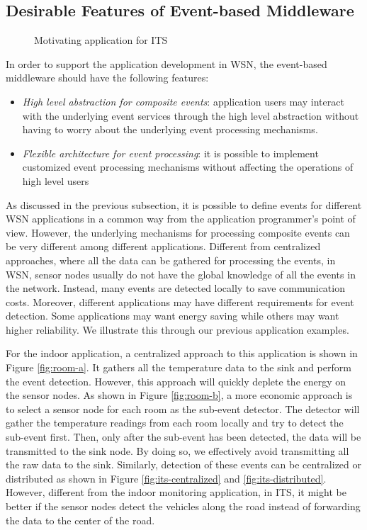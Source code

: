 \subsection{Desirable Features of Event-based Middleware}

\begin{figure}
\centering
{}
\caption{Motivating application for ITS}
\label{fig:its}
\end{figure}

In order to support the application development in WSN, the event-based middleware should have the following features:
\begin{itemize}
\item \emph{High level abstraction for composite events}: application users may interact with the underlying event services through the high level abstraction without having to worry about the underlying event processing mechanisms.
\item \emph{Flexible architecture for event processing}: it is possible to implement customized event processing mechanisms without affecting the operations of high level users
\end{itemize}

As discussed in the previous subsection, it is possible to define events for different WSN applications in a common way from the application programmer's point of view. However, the underlying mechanisms for processing composite events can be very different among different applications. Different from centralized approaches, where all the data can be gathered for processing the events, in WSN, sensor nodes usually do not have the global knowledge of all the events in the network. Instead, many events are detected locally to save communication costs. Moreover, different applications may have different requirements for event detection. Some applications may want energy saving while others may want higher reliability. We illustrate this through our previous application examples.

For the indoor application, a centralized approach to this application is shown in Figure \ref{fig:room-a}. It gathers all the temperature data to the sink and perform the event detection. However, this approach will quickly deplete the energy on the sensor nodes. As shown in Figure \ref{fig:room-b}, a more economic approach is to select a sensor node for each room as the sub-event detector. The detector will gather the temperature readings from each room locally and try to detect the sub-event first. Then, only after the sub-event has been detected, the data will be transmitted to the sink node. By doing so, we effectively avoid transmitting all the raw data to the sink. Similarly, detection of these events can be centralized or distributed as shown in Figure \ref{fig:its-centralized} and \ref{fig:its-distributed}. However, different from the indoor monitoring application, in ITS, it might be better if the sensor nodes detect the vehicles along the road instead of forwarding the data to the center of the road. 

